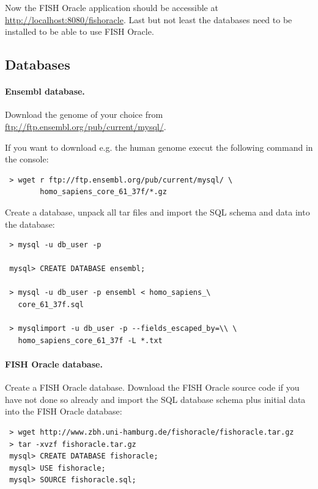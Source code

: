\documentclass[11pt,final]{article}
\begin{document}
Now the FISH Oracle application should be accessible at 
\url{http://localhost:8080/fishoracle}. Last but not least the databases
need to be installed to be able to use FISH Oracle.

\subsection{Databases}

\paragraph{Ensembl database.}

Download the genome of your choice from 
\url{ftp://ftp.ensembl.org/pub/current/mysql/}.

If you want to download e.g. the human genome execut the following command
in the console:

\begin{lstlisting}
 > wget r ftp://ftp.ensembl.org/pub/current/mysql/ \
        homo_sapiens_core_61_37f/*.gz
\end{lstlisting}

Create a database, unpack all tar files and import the SQL schema and data
into the database:

\begin{lstlisting}
 > mysql -u db_user -p

 mysql> CREATE DATABASE ensembl;

 > mysql -u db_user -p ensembl < homo_sapiens_\
   core_61_37f.sql

 > mysqlimport -u db_user -p --fields_escaped_by=\\ \
   homo_sapiens_core_61_37f -L *.txt
\end{lstlisting}

\paragraph{FISH Oracle database.}

Create a FISH Oracle database. Download the FISH Oracle source code if you 
have not done so already and import the SQL database schema plus initial
data into
the FISH Oracle database:


\begin{lstlisting}
 > wget http://www.zbh.uni-hamburg.de/fishoracle/fishoracle.tar.gz
 > tar -xvzf fishoracle.tar.gz
 mysql> CREATE DATABASE fishoracle;
 mysql> USE fishoracle;
 mysql> SOURCE fishoracle.sql;
\end{lstlisting}
\end{document}
